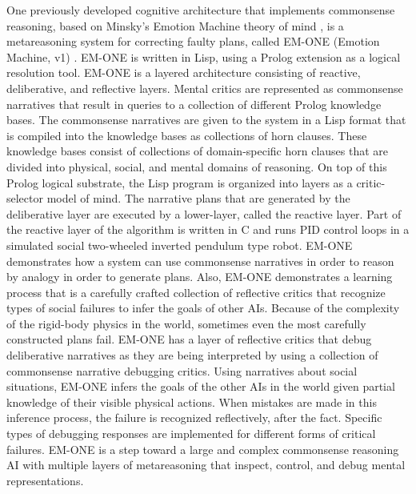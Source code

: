 One previously developed cognitive architecture that implements
commonsense reasoning, based on Minsky's Emotion Machine theory of
mind \cite[]{minsky:2006}, is a metareasoning system for correcting
faulty plans, called EM-ONE (Emotion Machine, v1)
\cite[]{singh:2005b}. EM-ONE is written in Lisp, using a Prolog
extension as a logical resolution tool. EM-ONE is a layered
architecture consisting of reactive, deliberative, and reflective
layers. Mental critics are represented as commonsense narratives that
result in queries to a collection of different Prolog knowledge
bases. The commonsense narratives are given to the system in a Lisp
format that is compiled into the knowledge bases as collections of
horn clauses. These knowledge bases consist of collections of
domain-specific horn clauses that are divided into physical, social,
and mental domains of reasoning. On top of this Prolog logical
substrate, the Lisp program is organized into layers as a
critic-selector model of mind. The narrative plans that are generated
by the deliberative layer are executed by a lower-layer, called the
reactive layer. Part of the reactive layer of the algorithm is written
in C and runs PID control loops in a simulated social two-wheeled
inverted pendulum type robot. EM-ONE demonstrates how a system can use
commonsense narratives in order to reason by analogy in order to
generate plans. Also, EM-ONE demonstrates a learning process that is a
carefully crafted collection of reflective critics that recognize
types of social failures to infer the goals of other AIs.  Because of
the complexity of the rigid-body physics in the world, sometimes even
the most carefully constructed plans fail. EM-ONE has a layer of
reflective critics that debug deliberative narratives as they are
being interpreted by using a collection of commonsense narrative
debugging critics.  Using narratives about social situations, EM-ONE
infers the goals of the other AIs in the world given partial knowledge
of their visible physical actions. When mistakes are made in this
inference process, the failure is recognized reflectively, after the
fact. Specific types of debugging responses are implemented for
different forms of critical failures. EM-ONE is a step toward a large
and complex commonsense reasoning AI with multiple layers of
metareasoning that inspect, control, and debug mental representations.

